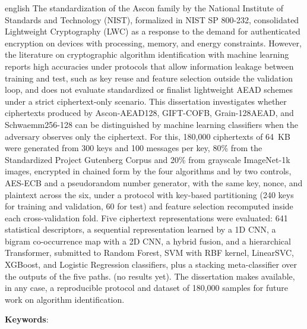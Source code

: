 \begin{resumo}[Abstract]
 \begin{otherlanguage*}{english}
\SingleSpacing
The standardization of the Ascon family by the National Institute of Standards and Technology (NIST), formalized in NIST SP 800-232, consolidated Lightweight Cryptography (LWC) as a response to the demand for authenticated encryption on devices with processing, memory, and energy constraints. However, the literature on cryptographic algorithm identification with machine learning reports high accuracies under protocols that allow information leakage between training and test, such as key reuse and feature selection outside the validation loop, and does not evaluate standardized or finalist lightweight AEAD schemes under a strict ciphertext-only scenario. This dissertation investigates whether ciphertexts produced by Ascon-AEAD128, GIFT-COFB, Grain-128AEAD, and Schwaemm256-128 can be distinguished by machine learning classifiers when the adversary observes only the ciphertext. For this, 180,000 ciphertexts of 64~KB were generated from 300 keys and 100 messages per key, 80\% from the Standardized Project Gutenberg Corpus and 20\% from grayscale ImageNet-1k images, encrypted in chained form by the four algorithms and by two controls, AES-ECB and a pseudorandom number generator, with the same key, nonce, and plaintext across the six, under a protocol with key-based partitioning (240 keys for training and validation, 60 for test) and feature selection recomputed inside each cross-validation fold. Five ciphertext representations were evaluated: 641 statistical descriptors, a sequential representation learned by a 1D CNN, a bigram co-occurrence map with a 2D CNN, a hybrid fusion, and a hierarchical Transformer, submitted to Random Forest, SVM with RBF kernel, LinearSVC, XGBoost, and Logistic Regression classifiers, plus a stacking meta-classifier over the outputs of the five paths. (no results yet). The dissertation makes available, in any case, a reproducible protocol and dataset of 180,000 samples for future work on algorithm identification.
   \vspace{\onelineskip}

   \noindent
   \textbf{Keywords}: \imprimirkeywords
 \end{otherlanguage*}
\end{resumo}